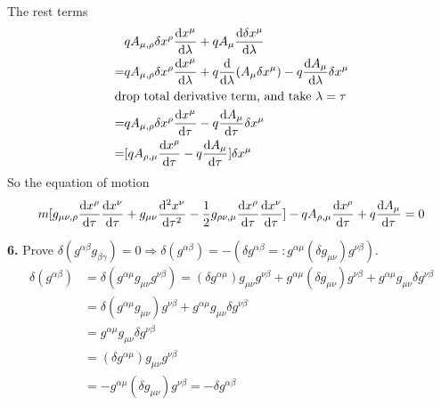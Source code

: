 \documentclass{article}
\begin{document}
The rest terms
\begin{align*}
  &qA_{\mu,\rho}\delta x^{\rho}\dv{x^{\mu}}{\lambda}+qA_{\mu}\dv{\delta x^{\mu}}{\lambda}\\
  =&qA_{\mu,\rho}\delta x^{\rho}\dv{x^{\mu}}{\lambda}+q\dv{\lambda}(A_{\mu}\delta x^{\mu})-q\dv{A_{\mu}}{\lambda}\delta x^{\mu}\\
  \intertext{drop total derivative term, and take $\lambda=\tau$}
  =&qA_{\mu,\rho}\delta x^{\rho}\dv{x^{\mu}}{\tau}-q\dv{A_{\mu}}{\tau}\delta x^{\mu}\\
  =&[qA_{\rho,\mu}\dv{x^{\rho}}{\tau}-q\dv{A_{\mu}}{\tau}]\delta x^{\mu}
\end{align*}
So the equation of motion
\begin{align*}
  m[g_{\mu\nu,\rho}\dv{x^{\rho}}{\tau}\dv{x^{\nu}}{\tau}+g_{\mu\nu}\dv[2]{x^{\nu}}{\tau}-\frac{1}{2} g_{\rho\nu,\mu}\dv{x^{\rho}}{\tau}\dv{x^{\nu}}{\tau}]-qA_{\rho,\mu}\dv{x^{\rho}}{\tau}+q\dv{A_{\mu}}{\tau}=0
\end{align*}

{\bf6.}\quad
Prove $\delta(g^{\alpha\beta}g_{\beta\gamma})=0\Longrightarrow\delta(g^{\alpha\beta})=-(\delta g^{\alpha\beta}=:g^{\alpha\mu}(\delta g_{\mu\nu})g^{\nu\beta})$.
\begin{align*}
  \delta(g^{\alpha\beta})&=\delta(g^{\alpha\mu}g_{\mu\nu}g^{\nu\beta})=(\delta g^{\alpha\mu})g_{\mu\nu}g^{\nu\beta}+g^{\alpha\mu}(\delta g_{\mu\nu})g^{\nu\beta}+g^{\alpha\mu}g_{\mu\nu}\delta g^{\nu\beta}\\
  &=\delta(g^{\alpha\mu}g_{\mu\nu})g^{\nu\beta}+g^{\alpha\mu}g_{\mu\nu}\delta g^{\nu\beta}\\
  &=g^{\alpha\mu}g_{\mu\nu}\delta g^{\nu\beta}\\
  &=(\delta g^{\alpha\mu})g_{\mu\nu}g^{\nu\beta}\\
  &=-g^{\alpha\mu}(\delta g_{\mu\nu})g^{\nu\beta}=-\delta g^{\alpha\beta}
\end{align*}
\end{document}
